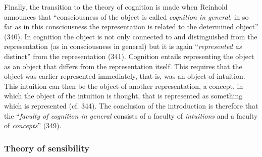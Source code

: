 Finally, the transition to the theory of cognition is made when Reinhold announces that ``consciousness of the object is called \textit{cognition in general}, in so far as in this consciousness the representation is related to the determined object'' (340). In cognition the object is not only connected to and distinguished from the representation (as in consciousness in general) but it is again ``\textit{represented as }distinct'' from the representation (341). Cognition entails representing the object as an object that differs from the representation itself. This requires that the object was earlier represented immediately, that is, was an object of intuition. This intuition can then be the object of another representation, a concept, in which the object of the intuition is thought, that is represented as something which is represented (cf. 344). The conclusion of the introduction is therefore that the ``\textit{faculty of cognition in general} consists of a faculty of \textit{intuitions} and a faculty of \textit{concepts}'' (349). 


\subsubsection{Theory of sensibility}


